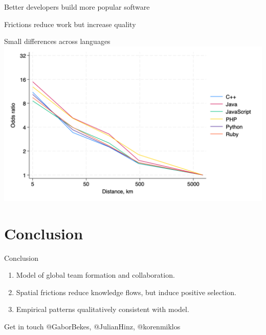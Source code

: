 \documentclass[
  ignorenonframetext,
  aspectratio=169,
]{beamer}
\providecommand{\tightlist}{%
  \setlength{\itemsep}{0pt}\setlength{\parskip}{0pt}}
\begin{document}
\begin{frame}{Better developers build more popular software}
\protect\hypertarget{better-developers-build-more-popular-software}{}
\vspace*{-2ex}\hspace*{-2em}
\end{frame}

\begin{frame}{Frictions reduce work but increase quality}
\protect\hypertarget{frictions-reduce-work-but-increase-quality}{}
\vspace*{-2ex}\hspace*{-2em}
\end{frame}

\begin{frame}{Small differences across languages}
\protect\hypertarget{small-differences-across-languages}{}
\includegraphics{figures/commits_by_language.png}
\end{frame}

\section{Conclusion}\label{conclusion}

\begin{frame}{Conclusion}
\protect\hypertarget{conclusion-1}{}
\begin{enumerate}
\tightlist
\item
  Model of global team formation and collaboration.
\item
  Spatial frictions reduce knowledge flows, but induce positive
  selection.
\item
  Empirical patterns qualitatively consistent with model.
\end{enumerate}
\end{frame}

\begin{frame}{Get in touch}
\protect\hypertarget{get-in-touch}{}
@GaborBekes, @JulianHinz, @korenmiklos
\end{frame}
\end{document}
